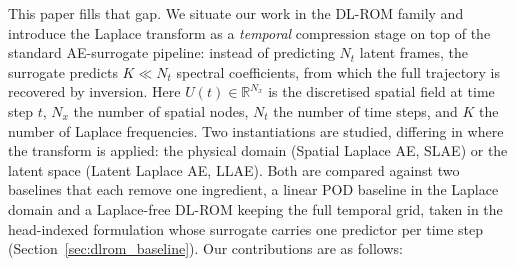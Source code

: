 ﻿\documentclass[a4paper,12pt]{article}
\theoremstyle{definition}
\theoremstyle{remark}
\newcommand{\R}{\mathbb{R}}
\begin{document}
This paper fills that gap. We situate our work in the DL-ROM family and introduce the Laplace transform as a \emph{temporal} compression stage on top of the standard AE-surrogate pipeline: instead of predicting $N_t$ latent frames, the surrogate predicts $K \ll N_t$ spectral coefficients, from which the full trajectory is recovered by inversion. Here $U(t) \in \R^{N_x}$ is the discretised spatial field at time step $t$, $N_x$ the number of spatial nodes, $N_t$ the number of time steps, and $K$ the number of Laplace frequencies. Two instantiations are studied, differing in where the transform is applied: the physical domain (Spatial Laplace AE, SLAE) or the latent space (Latent Laplace AE, LLAE). Both are compared against two baselines that each remove one ingredient, a linear POD baseline in the Laplace domain and a Laplace-free DL-ROM keeping the full temporal grid, taken in the head-indexed formulation whose surrogate carries one predictor per time step (Section~\ref{sec:dlrom_baseline}). Our contributions are as follows:
\end{document}
